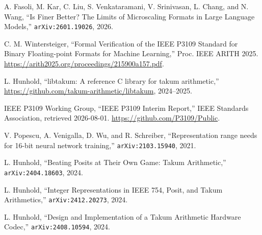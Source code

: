  A. Fasoli, M. Kar, C. Liu, S. Venkataramani, V. Srinivasan, L. Chang, and N. Wang, ``Is Finer Better? The Limits of Microscaling Formats in Large Language Models,''
  \texttt{arXiv:2601.19026}, 2026.

 C. M. Wintersteiger, ``Formal Verification of the IEEE P3109 Standard for Binary Floating-point Formats for Machine Learning,''
  Proc. IEEE ARITH 2025.
  \url{https://arith2025.org/proceedings/215900a157.pdf}.

 L. Hunhold, ``libtakum: A reference C library for takum
  arithmetic,'' \url{https://github.com/takum-arithmetic/libtakum}, 2024--2025.

 IEEE P3109 Working Group, ``IEEE P3109 Interim Report,''
  IEEE Standards Association, retrieved 2026-08-01.
  \url{https://github.com/P3109/Public}.



 V. Popescu, A. Venigalla, D. Wu, and R. Schreiber, ``Representation range needs for 16-bit neural network training,''
  \texttt{arXiv:2103.15940}, 2021.

 L. Hunhold, ``Beating Posits at Their Own Game: Takum Arithmetic,''
  \texttt{arXiv:2404.18603}, 2024.

 L. Hunhold, ``Integer Representations in IEEE 754, Posit, and Takum Arithmetics,''
  \texttt{arXiv:2412.20273}, 2024.

 L. Hunhold, ``Design and Implementation of a Takum Arithmetic Hardware Codec,''
  \texttt{arXiv:2408.10594}, 2024.

